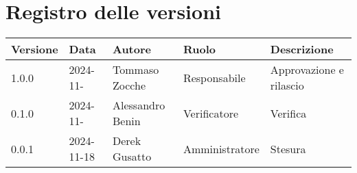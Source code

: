 
\section*{Registro delle versioni}
\begin{table}[H]
     \begin{tabularx}{1.2\textwidth}{|p{2cm}|X|X|p{2.7cm}|p{5cm}|}
        \hline
         \textbf{Versione} &  \textbf{Data} &  \textbf{Autore} &  \textbf{Ruolo} & \textbf{Descrizione} \\
          \hline
          1.0.0& 2024-11- & Tommaso Zocche & Responsabile & Approvazione e rilascio\\
          \hline
          0.1.0& 2024-11- & Alessandro Benin & Verificatore & Verifica \\
          \hline
          0.0.1& 2024-11-18 & Derek Gusatto & Amministratore & Stesura \\
          \hline
    \end{tabularx}
\end{table}
